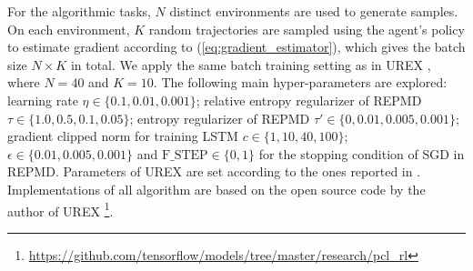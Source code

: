 For the algorithmic tasks, $N$ distinct environments are used to generate samples. On each environment, $K$ random trajectories are sampled using the agent's policy to estimate gradient according to (\ref{eq:gradient_estimator}), which gives the batch size $N\times K$ in total. We apply the same batch training setting as in UREX \citep{nachum2017improving}, where $N=40$ and $K=10$. The following main hyper-parameters are explored: learning rate $\eta \in \{0.1, 0.01, 0.001\}$; relative entropy regularizer of REPMD $\tau\in \{1.0, 0.5, 0.1, 0.05\}$; entropy regularizer of REPMD $\tau'\in \{0, 0.01, 0.005, 0.001\}$; gradient clipped norm for training LSTM $c\in \{1, 10, 40, 100\}$; $\epsilon\in \{0.01, 0.005, 0.001\}$ and $\text{F\_STEP}\in \{0,1\}$ for the stopping condition of SGD in REPMD. Parameters of UREX are set according to the ones reported in \citet{nachum2017improving}. Implementations of all algorithm are based on the open source code by the author of UREX \footnote{\url{https://github.com/tensorflow/models/tree/master/research/pcl_rl}}.

